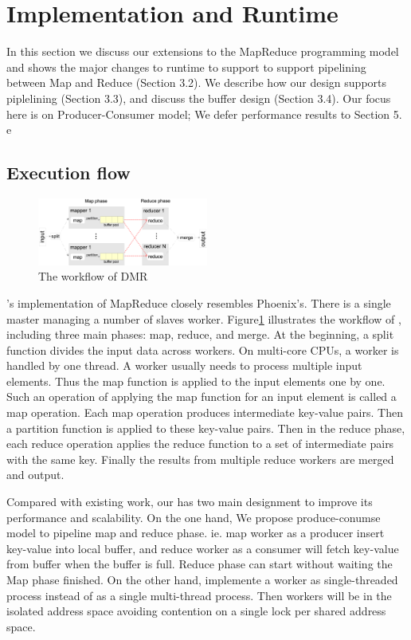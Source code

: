 \section{Implementation and Runtime}
In this section we discuss our extensions to 
the MapReduce programming model and shows the major changes to runtime to 
support \myds
to support pipelining between Map and Reduce (Section 3.2). 
We describe how our design supports
piplelining (Section 3.3), and discuss the buffer design (Section 3.4). 
Our focus here is on Producer-Consumer model; 
We defer performance results to Section 5.
e


\subsection{Execution flow}
\begin{figure}[!h!t]  
    \centering
    \includegraphics[width=0.5\textwidth]{eps/dmr_workflow.eps}
    \caption{The workflow of DMR}
    \label{fig:dmr:workflow}
\end{figure}

\myds’s implementation of MapReduce closely resembles Phoenix’s. 
There is a single master managing a number of slaves worker. 
Figure\ref{fig:dmr:workflow} illustrates the workflow of \myds,
including three main phases: map, reduce, and merge. 
At the beginning, a split function divides the input
data across workers. 
On multi-core CPUs, a worker is handled by one thread. 
A worker usually needs to process multiple input elements. 
Thus the map function is applied to the input elements one by one. 
Such an operation of applying the map function for an input element is 
called a map operation. 
Each map operation produces intermediate key-value pairs. 
Then a partition function is applied to these key-value pairs. 
Then in the reduce phase, each reduce operation
applies the reduce function to a set of intermediate pairs
with the same key. 
Finally the results from multiple reduce workers are merged and output.

Compared with existing work, 
our \myds has two main designment to improve its performance and scalability.
On the one hand, We propose produce-conumse model to 
pipeline map and reduce phase. 
ie. map worker as a producer insert key-value into local buffer,
and reduce worker as a consumer will fetch key-value from buffer
when the buffer is full. 
Reduce phase can start without waiting the Map phase finished.
On the other hand, \myds implemente a worker as single-threaded process 
instead of as a single multi-thread process.
Then workers will be in the isolated address space 
avoiding contention on a single lock per shared address space.

